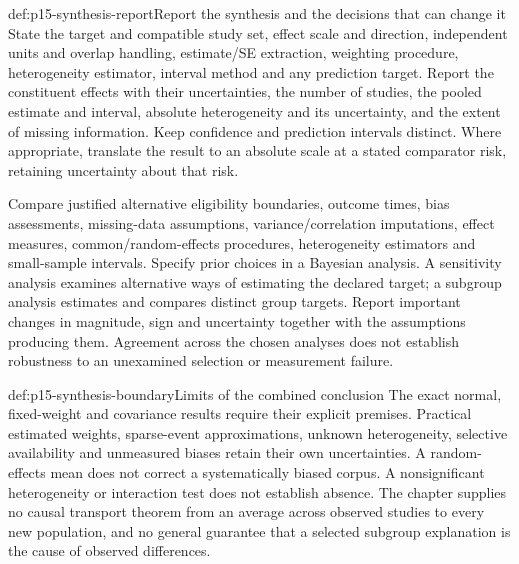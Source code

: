 \begin{hbmethod}{def:p15-synthesis-report}{Report the synthesis and the decisions that can change it}
State the target and compatible study set, effect scale and direction,
independent units and overlap handling, estimate/SE extraction, weighting
procedure, heterogeneity estimator, interval method and any prediction target.
Report the constituent effects with their uncertainties, the number of studies,
the pooled estimate and interval, absolute heterogeneity and its uncertainty,
and the extent of missing information. Keep confidence and prediction intervals
distinct. Where appropriate, translate the result to an absolute scale at a
stated comparator risk, retaining uncertainty about that risk.

Compare justified alternative eligibility boundaries, outcome times, bias
assessments, missing-data assumptions, variance/correlation imputations,
effect measures, common/random-effects procedures, heterogeneity estimators
and small-sample intervals. Specify prior choices in a Bayesian analysis.
A sensitivity analysis examines alternative ways of estimating the declared
target; a subgroup analysis estimates and compares distinct group targets.
Report important changes in magnitude, sign and uncertainty together with
the assumptions producing them. Agreement across the chosen analyses does
not establish robustness to an unexamined selection or measurement failure.
\end{hbmethod}

\begin{proofboundary}{def:p15-synthesis-boundary}{Limits of the combined conclusion}
The exact normal, fixed-weight and covariance results require their explicit
premises. Practical estimated weights, sparse-event approximations, unknown
heterogeneity, selective availability and unmeasured biases retain their own
uncertainties. A random-effects mean does not correct a systematically biased
corpus. A nonsignificant heterogeneity or interaction test does not establish
absence. The chapter supplies no causal transport theorem from an average
across observed studies to every new population, and no general guarantee
that a selected subgroup explanation is the cause of observed differences.
\end{proofboundary}
